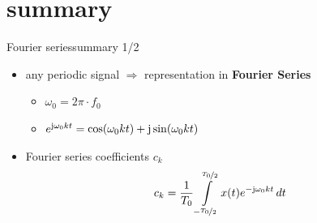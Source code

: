 \section{summary}
    \begin{frame}{Fourier series}{summary 1/2}
        \begin{itemize}
            \item	any periodic signal $\Rightarrow$ representation in \textbf{Fourier Series}
                \pause
                \begin{itemize}
                    \item	$\omega_0 = 2\pi\cdot f_0$
                    \pause
                    \item	${e}^{\mathrm{j}\omega_0kt} = \cos(\omega_0kt) + \mathrm{j} \sin(\omega_0kt)$	\nonumber		
                \end{itemize}
        
            \pause
            \item	Fourier series coefficients $c_k$
                \begin {equation*}\label{eq:fourier_coeff}
                    c_k = \frac{1}{T_0}\int\limits_{-\nicefrac{T_0}{2}}^{\nicefrac{T_0}{2}} x(t) {e}^{-\mathrm{j}\omega_0kt}\, dt \nonumber
                \end {equation*}
        \end{itemize}
    \end{frame}

